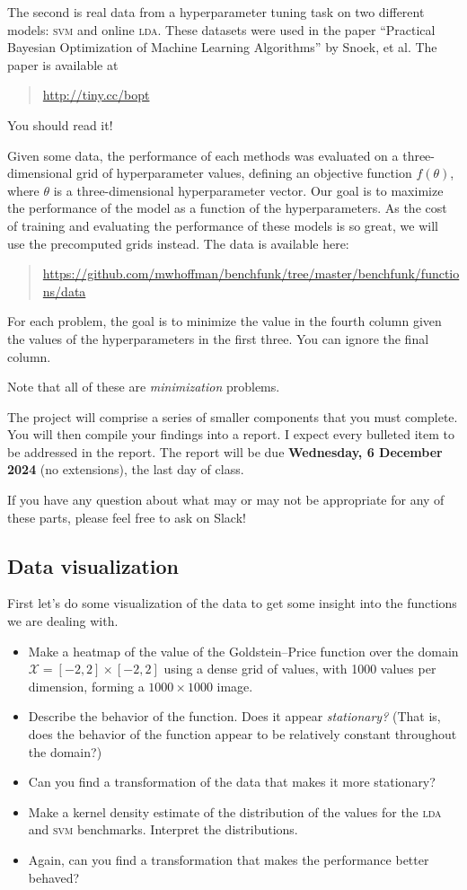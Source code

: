 \documentclass{article}
\newcommand{\acro}[1]{\textsc{\MakeLowercase{#1}}}
\newcommand{\mc}[1]{\mathcal{#1}}
\begin{document}
The second is real data from a hyperparameter tuning task on two different
models: \acro{SVM} and online \acro{LDA}. These datasets were used in the paper
``Practical Bayesian Optimization of Machine Learning Algorithms'' by Snoek, et
al. The paper is available at
\begin{quote}
  \url{http://tiny.cc/bopt}
\end{quote}
You should read it!

Given some data, the performance of each methods was evaluated on a
three-dimensional grid of hyperparameter values, defining an objective function
$f(\theta)$, where $\theta$ is a three-dimensional hyperparameter vector. Our
goal is to maximize the performance of the model as a function of the
hyperparameters.  As the cost of training and evaluating the performance of
these models is so great, we will use the precomputed grids instead. The data is
available here:
\begin{quote}
  \url{https://github.com/mwhoffman/benchfunk/tree/master/benchfunk/functions/data}
\end{quote}
For each problem, the goal is to minimize the value in the fourth column given
the values of the hyperparameters in the first three. You can ignore the final
column.

Note that all of these are \emph{minimization} problems.

The project will comprise a series of smaller components that you must
complete. You will then compile your findings into a report. I expect every
bulleted item to be addressed in the report. The report will be due
\textbf{Wednesday, 6 December 2024} (no extensions), the last day of class.

If you have any question about what may or may not be appropriate for any of
these parts, please feel free to ask on Slack!

\subsection*{Data visualization}

First let's do some visualization of the data to get some insight into the
functions we are dealing with.

\begin{itemize}
\item
  Make a heatmap of the value of the Goldstein--Price function over the domain $\mc{X} =
  [-2, 2] \times [-2, 2]$ using a dense grid of values, with 1000 values per
  dimension, forming a $1000 \times 1000$ image.
\item
  Describe the behavior of the function. Does it appear \emph{stationary?} (That
  is, does the behavior of the function appear to be relatively constant
  throughout the domain?)
\item Can you find a transformation of the data that makes it more stationary?
\item
  Make a kernel density estimate of the distribution of the values for the
  \acro{LDA} and \acro{SVM} benchmarks. Interpret the distributions.
\item
  Again, can you find a transformation that makes the performance better
  behaved?
\end{itemize}
\end{document}
